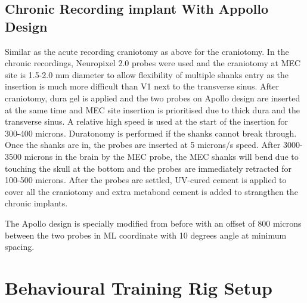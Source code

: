 \subsection{Chronic Recording implant With Appollo Design}
Similar as the acute recording craniotomy as above for the craniotomy. In the chronic recordings, Neuropixel 2.0 probes were used and the craniotomy at MEC site is 1.5-2.0 mm diameter to allow flexibility of  multiple shanks entry as the insertion is much more difficult than V1 next to the transverse sinus. After craniotomy, dura gel is applied and the two probes on Apollo design are inserted at the same time and MEC site insertion is prioritised due to thick dura and the transverse sinus. A relative high speed is used at the start of the insertion for 300-400 microns. Duratonomy is performed if the shanks cannot break through. Once the shanks are in, the probes are inserted at 5 microns/s speed. After 3000-3500 microns in the brain by the MEC probe, the MEC shanks will bend due to touching the skull at the bottom and the probes are immediately retracted for 100-500 microns. After the probes are settled, UV-cured cement is applied to cover all the craniotomy and extra metabond cement is added to strangthen the chronic implants.

The Apollo design is specially modified from before with an offset of 800 microns between the two probes in ML coordinate with 10 degrees angle at minimum spacing.



\section{Behavioural Training Rig Setup}
